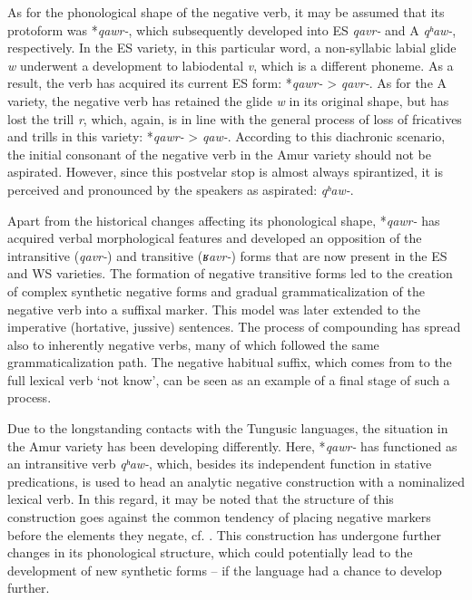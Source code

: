 \documentclass[output=paper,colorlinks,citecolor=brown]{langscibook}
\begin{document}
As for the phonological shape of the negative verb, it may be assumed that its protoform was *\textit{qawr-}, which subsequently developed into ES \textit{qavr-} and A \textit{qʰaw-}, respectively. In the ES variety, in this particular word, a non-syllabic labial glide \textit{w} underwent a development to labiodental \textit{v}, which is a different phoneme. As a result, the verb has acquired its current ES form: *\textit{qawr-} > \textit{qavr-}. As for the A variety, the negative verb has retained the glide \textit{w} in its original shape, but has lost the trill \textit{r}, which, again, is in line with the general process of loss of fricatives and trills in this variety: *\textit{qawr-} > \textit{qaw-}. According to this diachronic scenario, the initial consonant of the negative verb in the Amur variety should not be aspirated. However, since this postvelar stop is almost always spirantized, it is perceived and pronounced by the speakers as aspirated: \textit{qʰaw-}.

Apart from the historical changes affecting its phonological shape, *\textit{qawr-} has acquired verbal morphological features and developed an opposition of the intransitive (\textit{qavr-}) and transitive (\textit{ʁavr-}) forms that are now present in the ES and WS varieties. The formation of negative transitive forms led to the creation of complex synthetic negative forms and gradual grammaticalization of the negative verb into a suffixal marker. This model was later extended to the imperative (hortative, jussive) sentences. The process of compounding has spread also to inherently negative verbs, many of which followed the same grammaticalization path. The negative habitual suffix, which comes from to the full lexical verb ‘not know’, can be seen as an example of a final stage of such a process.

Due to the longstanding contacts with the Tungusic languages, the situation in the Amur variety has been developing differently. Here, *\textit{qawr-} has functioned as an intransitive verb \textit{qʰaw-}, which, besides its independent function in stative predications, is used to head an analytic negative construction with a nominalized lexical verb. In this regard, it may be noted that the structure of this construction goes against the common tendency of placing negative markers before the elements they negate, cf. \citet{Dryer2013-wals143}. This construction has undergone further changes in its phonological structure, which could potentially lead to the development of new synthetic forms – if the language had a chance to develop further.
\end{document}
